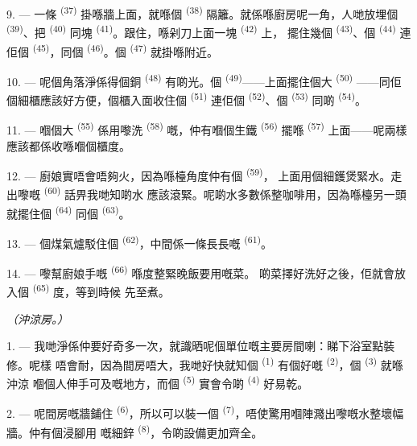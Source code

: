 9. --- 一條 \textsuperscript{(37)} 掛喺牆上面，就喺個
\textsuperscript{(38)} 隔籬。就係喺廚房呢一角，人哋放埋個
\textsuperscript{(39)}、把 \textsuperscript{(40)} 同塊
\textsuperscript{(41)}。跟住，喺剁刀上面一塊 \textsuperscript{(42)} 上，
擺住幾個 \textsuperscript{(43)}、個 \textsuperscript{(44)}
連佢個 \textsuperscript{(45)}，同個 \textsuperscript{(46)}。個
 \textsuperscript{(47)} 就掛喺附近。

10. --- 呢個角落淨係得個銅 \textsuperscript{(48)} 有啲光。個
 \textsuperscript{(49)}——上面擺住個大 \textsuperscript{(50)}
——同佢個細櫃應該好方便，個櫃入面收住個 \textsuperscript{(51)}
連佢個 \textsuperscript{(52)}、個 \textsuperscript{(53)}
同啲 \textsuperscript{(54)}。

\VUsaut{4.0mm}
\VUsaut{3.0mm}

11. --- 嗰個大 \textsuperscript{(55)} 係用嚟洗
\textsuperscript{(58)} 嘅，仲有嗰個生鐵 \textsuperscript{(56)} 擺喺
 \textsuperscript{(57)} 上面——呢兩樣應該都係收喺嗰個櫃度。

12. --- 廚娘實唔會唔夠火，因為喺檯角度仲有個 \textsuperscript{(59)}，
上面用個細鑊煲緊水。走出嚟嘅 \textsuperscript{(60)} 話畀我哋知啲水
應該滾緊。呢啲水多數係整咖啡用，因為喺檯另一頭就擺住個
\textsuperscript{(64)} 同個 \textsuperscript{(63)}。

13. --- 個煤氣爐駁住個 \textsuperscript{(62)}，中間係一條長長嘅
 \textsuperscript{(61)}。

14. --- 嚟幫廚娘手嘅 \textsuperscript{(66)} 喺度整緊晚飯要用嘅菜。
啲菜擇好洗好之後，佢就會放入個 \textsuperscript{(65)} 度，等到時候
先至煮。

\VUsaut{4.0mm}
{\centering\fontsize{10.2pt}{10.2pt}\selectfont{} \textit{（沖涼房。）}\par}
\VUsaut{3.0mm}

1. --- 我哋淨係仲要好奇多一次，就識晒呢個單位嘅主要房間喇：睇下浴室點裝修。呢樣
唔會耐，因為間房唔大，我哋好快就知個 \textsuperscript{(1)} 有個好嘅
 \textsuperscript{(2)}，個 \textsuperscript{(3)} 就喺沖涼
嗰個人伸手可及嘅地方，而個 \textsuperscript{(5)} 實會令啲
\textsuperscript{(4)} 好易乾。

2. --- 呢間房嘅牆鋪住 \textsuperscript{(6)}，所以可以裝一個
 \textsuperscript{(7)}，唔使驚用嗰陣濺出嚟嘅水整壞幅牆。仲有個浸腳用
嘅細鋅 \textsuperscript{(8)}，令啲設備更加齊全。
\VUsaut{6.0mm}
\VUfilet{22mm}
